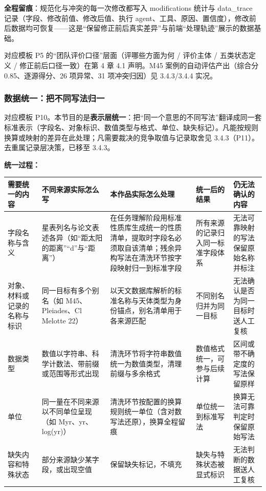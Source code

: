 \noindent\textbf{全程留痕}：规范化与冲突的每一次修改都写入 modifications 统计与 data\_trace 记录（字段、修改前值、修改后值、执行 agent、工具、原因、置信度），修改前后数据均可恢复——这是“保留修正前后真实差异”与前端“处理轨迹”展示的数据基础。

\bigskip
\noindent 对应模板 P5 的“团队评价口径”层面（评哪些方面为何 / 评价主体 / 五类状态定义 / 修正前后口径一致）在第 4 章 4.1 声明。M45 案例的自动评估产出（综合分 0.85、逐源得分、26 项异常、31 项冲突归因）见 3.4.3/3.4.4 实况。

\subsubsection{数据统一：把不同写法归一}

对应模板 P10。本节目的是\textbf{表示层统一}：把“同一个意思的不同写法”翻译成同一套标准表示（字段名、对象标识、数值类型与格式、单位、缺失标记）。凡能按规则换算或映射的差异在此处理；凡需要裁决的竞争取值与记录取舍见 3.4.3（P11）。去重属记录层决策，已移至 3.4.3。

\noindent\textbf{统一过程：}

\begin{longtable}{@{}p{2.2cm}p{3.4cm}p{5.4cm}p{2.4cm}p{1.9cm}@{}}
\toprule
需要统一的内容 & 不同来源实际怎么写 & 本作品实际怎么处理 & 统一后的结果 & 仍无法确认的内容 \\
\midrule
字段名称与含义 & 星表列名与论文表述各异（如“距太阳的距离”“d”与“距离”） & 在任务理解阶段用标准性质库生成统一的性质清单，提取时字段名必须取自该清单；残余异构写法在清洗环节按字段映射归一到标准字段 & 所有来源的记录归入同一标准字段体系 & 无法可靠映射的写法保留原始名称并标注 \\
对象、材料或记录的名称与标识 & 同一目标有多个别名（如 M45、Pleiades、Cl Melotte 22） & 以天文数据库解析的标准名称与天体类型为身份锚点，别名清单用于各来源匹配 & 不同别名归并为同一目标 & 无法确认是否为同一目标时送人工复核 \\
数据类型 & 数值以字符串、科学计数法、带前缀或范围等形式出现 & 清洗环节将字符串数值统一为数值类型，清理前缀与多余格式 & 数值格式统一，可参与后续计算 & 区间或带不确定度的写法保留原样 \\
单位 & 同一量在不同来源以不同单位呈现（如 Myr、yr、log(yr)） & 清洗环节按配置的换算规则统一单位（含对数写法还原），换算全程留痕 & 单位统一到标准写法 & 换算无法可靠判定时保留原始写法 \\
缺失内容和特殊状态 & 部分来源缺少某字段，或出现空值 & 保留缺失标记，不填充 & 缺失与特殊状态被显式标识 & 无法判断的数据送人工复核 \\
\bottomrule
\end{longtable}

